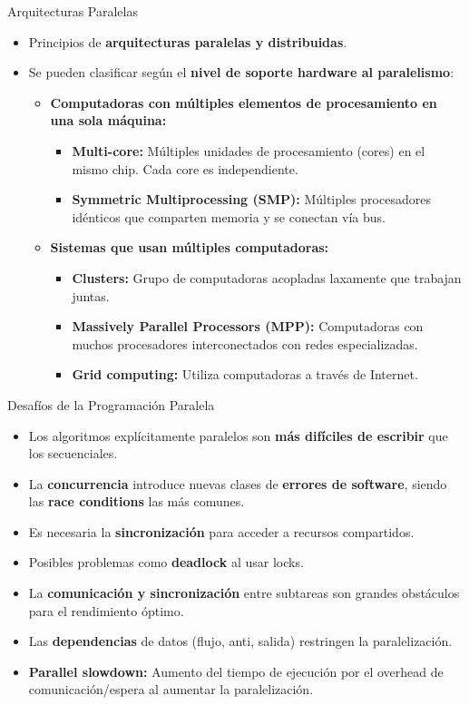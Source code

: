 \begin{frame}{Arquitecturas Paralelas}
  \begin{itemize}
    \item Principios de \textbf{arquitecturas paralelas y distribuidas}.
    \item Se pueden clasificar según el \textbf{nivel de soporte hardware al paralelismo}:
    \begin{itemize}
      \item \textbf{Computadoras con múltiples elementos de procesamiento en una sola máquina:}
      \begin{itemize}
        \item \textbf{Multi-core:} Múltiples unidades de procesamiento (cores) en el mismo chip. Cada core es independiente.
        \item \textbf{Symmetric Multiprocessing (SMP):} Múltiples procesadores idénticos que comparten memoria y se conectan vía bus.
      \end{itemize}
      \item \textbf{Sistemas que usan múltiples computadoras:}
      \begin{itemize}
        \item \textbf{Clusters:} Grupo de computadoras acopladas laxamente que trabajan juntas.
        \item \textbf{Massively Parallel Processors (MPP):} Computadoras con muchos procesadores interconectados con redes especializadas.
        \item \textbf{Grid computing:} Utiliza computadoras a través de Internet.
      \end{itemize}
    \end{itemize}
  \end{itemize}
\end{frame}

\begin{frame}{Desafíos de la Programación Paralela}
  \begin{itemize}
    \item Los algoritmos explícitamente paralelos son \textbf{más difíciles de escribir} que los secuenciales.
    \item La \textbf{concurrencia} introduce nuevas clases de \textbf{errores de software}, siendo las \textbf{race conditions} las más comunes.
    \item Es necesaria la \textbf{sincronización} para acceder a recursos compartidos.
    \item Posibles problemas como \textbf{deadlock} al usar locks.
    \item La \textbf{comunicación y sincronización} entre subtareas son grandes obstáculos para el rendimiento óptimo.
    \item Las \textbf{dependencias} de datos (flujo, anti, salida) restringen la paralelización.
    \item \textbf{Parallel slowdown:} Aumento del tiempo de ejecución por el overhead de comunicación/espera al aumentar la paralelización.
  \end{itemize}
\end{frame}

